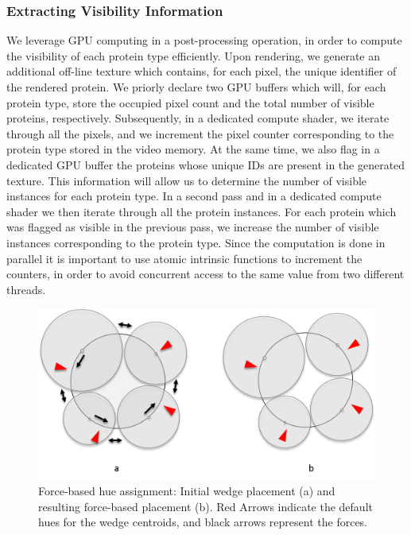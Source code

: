 \documentclass{egpubl}
\begin{document}
	\subsubsection{Extracting Visibility Information}
	\label{sssec:extracting}
	We leverage GPU computing in a post-processing operation, in order to compute the visibility of each protein type efficiently.
	Upon rendering, we generate an additional off-line texture which contains, for each pixel, the unique identifier of the rendered protein.
	We priorly declare two GPU buffers which will, for each protein type, store the occupied pixel count and the total number of visible proteins, respectively.
	Subsequently, in a dedicated compute shader, we iterate through all the pixels, and we increment the pixel counter corresponding to the protein type stored in the video memory.
	At the same time, we also flag in a dedicated GPU buffer the proteins whose unique IDs are present in the generated texture.
	This information will allow us to determine the number of visible instances for each protein type.
	In a second pass and in a dedicated compute shader we then iterate through all the protein instances.
	For each protein which was flagged as visible in the previous pass, we increase the number of visible instances corresponding to the protein type.
	Since the computation is done in parallel it is important to use atomic intrinsic functions to increment the counters, in order to avoid concurrent access to the same value from two different threads.
	
	\begin{figure}
		\centering
		\includegraphics[width=0.85\linewidth]{"Figures/force-based layout"}
		\caption{Force-based hue assignment: Initial wedge placement (a) and resulting force-based placement (b). Red Arrows indicate the default hues for the wedge centroids, and black arrows represent the forces. }
		\label{fig:force-basedlayout}
	\end{figure}
	
\end{document}
